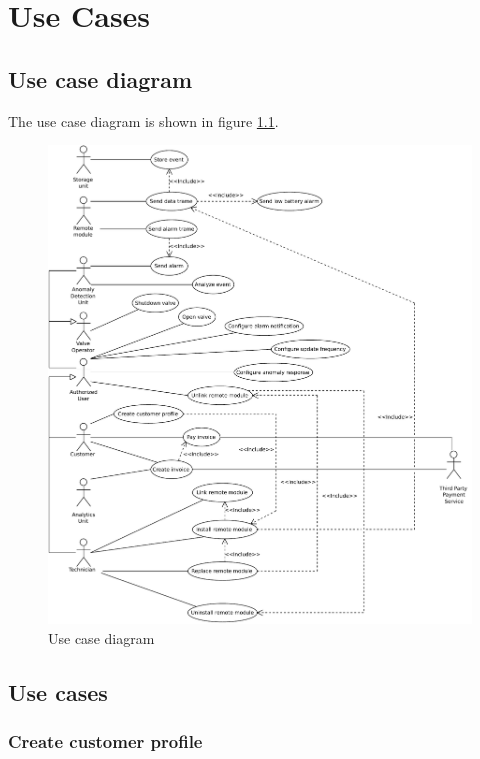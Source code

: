 \chapter{Use Cases}
\label{use-cases}

\section{Use case diagram}

\npar The use case diagram is shown in figure \ref{fig:use-case-diagram}.

\begin{figure}[H]
	\begin{centering}
		\includegraphics[width=\textwidth]{figs/use-case-diagram.pdf}
		\caption{Use case diagram}
		\label{fig:use-case-diagram}
	\end{centering}
\end{figure}

\newpage
\section{Use cases}
\subsection{Create customer profile}
\label{uc:create-customer-profile}


